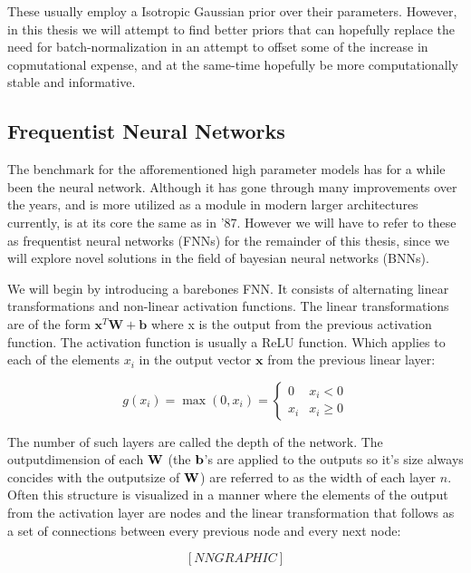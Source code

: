 \documentclass[nofootinbib,UKenglish,nobalancelastpage,12pt]{article}
\newcommand{\vect}{\ensuremath{\mathbf}}
\begin{document}
These usually employ a Isotropic Gaussian prior over their parameters. However, in this thesis we will attempt to find better priors that can hopefully replace the need for batch-normalization in an attempt to offset some of the increase in copmutational expense, and at the same-time hopefully be more computationally stable and informative.
\clearpage
\subsection{Frequentist Neural Networks}

The benchmark for the afforementioned high parameter models has for a while been the neural network. Although it has gone through many improvements over the years, and is more utilized as a module in modern larger architectures currently, is at its core the same as in '87. \cite{LeCun1987} However we will have to refer to these as frequentist neural networks (FNNs) for the remainder of this thesis, since we will explore novel solutions in the field of bayesian neural networks (BNNs).

We will begin by introducing a barebones FNN. It consists of alternating linear transformations and non-linear activation functions. The linear transformations are of the form $\textbf{x}^T\textbf{W}+\textbf{b}$ where x is the output from the previous activation function. The activation function is usually a ReLU function. Which applies to each of the elements $x_{i}$ in the output vector $\textbf{x}$ from the previous linear layer:

$$
g(x_{i}) = \max(0,x_{i}) =
\begin{cases}
0 & x_{i} < 0 \\
x_{i} & x_{i} \geq 0
\end{cases}
$$

The number of such layers are called the depth of the network. The outputdimension of each $\vect{W}$ (the $\vect{b}$'s are applied to the outputs so it's size always concides with the outputsize of $\vect{W}$) are referred to as the width of each layer $n$. Often this structure is visualized in a manner where the elements of the output from the activation layer are nodes and the linear transformation that follows as a set of connections between every previous node and every next node:

$$
[NN GRAPHIC]
$$
\end{document}
